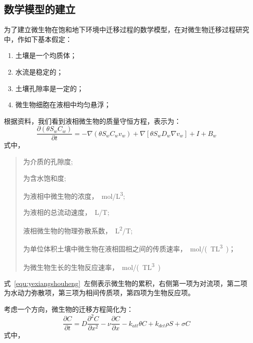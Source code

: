 \documentclass[a4paper,cs4size,adobefonts,fancyhdr]{ctexart}[2005/11/25]
\numberwithin{equation}{section} %
\begin{document}
\subsection{数学模型的建立}
为了建立微生物在饱和地下环境中迁移过程的数学模型，在对微生物迁移过程研究中，作如下基本假定：
\begin{enumerate}\setlength{\itemsep}{0em}
\item 土壤是一个均质体； 
\item 水流是稳定的； 
\item 土壤孔隙率是一定的； 
\item 微生物细胞在液相中均匀悬浮； 
\end{enumerate}\par
根据资料，我们看到液相微生物的质量守恒方程，表示为：
\begin{equation}\label{equ:yexiangshouheng}
\dfrac{\partial(\theta S_w C_w)}{\partial t}
=-\nabla(\theta S_w C_w v_w)+\nabla[\theta S_wD_w\nabla v_w]+I+B_w
\end{equation}
式中，
	\begin{quote}
	\begin{description}\setlength{\itemsep}{0em}
	\item[$\theta$]为介质的孔隙度;
	\item[$S_w$]为含水饱和度;
	\item[$C_w$]为液相中微生物的浓度，\SI{}{mol/L^3};
	\item[$V_w$]为液相的总流动速度，\SI{}{L/T};
	\item[$D_w$]液相微生物的物理弥散系数，\SI{}{L^2/T};
	\item[$I$]为单位体积土壤中微生物在液相固相之间的传质速率，\SI{}{mol/(TL^3)}；
	\item[$B_w$]为微生物生长的生物反应速率，\SI{}{mol/(TL^3)}
	\end{description}
	\end{quote}\par
式~\ref{equ:yexiangshouheng}~左侧表示微生物的累积，右侧第一项为对流项，第二项为水动力弥散项，第三项为相间传质项，第四项为生物反应项。\par
考虑一个方向，微生物的迁移方程简化为：
	\begin{equation}\label{qianyif}
	\dfrac{\partial C}{\partial t}=D\dfrac{\partial^2 C}{\partial x^2}-\nu\dfrac{\partial C}{\partial x}-k_{att}\theta C+k_{det}\rho S+\sigma C
	\end{equation}
式中，
\end{document}
